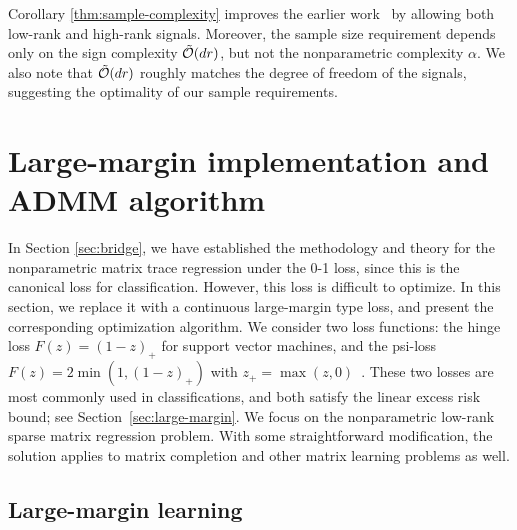 \documentclass[aos]{imsart}
\theoremstyle{definition}
\begin{document}
\noindent
Corollary \ref{thm:sample-complexity} improves the earlier work~\cite{yuan2016tensor, pmlr-v119-lee20i} by allowing both low-rank and high-rank signals. Moreover, the sample size requirement depends only on the sign complexity $\tilde {\mathcal{O}}(dr)$, but not the nonparametric complexity $\alpha$. We also note that $\tilde {\mathcal{O}}(dr)$ roughly matches the degree of freedom of the signals, suggesting the optimality of our sample requirements.





\section{Large-margin implementation and ADMM algorithm}
\label{sec:estimation}

In Section \ref{sec:bridge}, we have established the methodology and theory for the nonparametric matrix trace regression under the 0-1 loss, since this is the canonical loss for classification. However, this loss is difficult to optimize. In this section, we replace it with a continuous large-margin type loss, and present the corresponding optimization algorithm. We consider two loss functions: the hinge loss $F(z) = (1-z)_+$ for support vector machines, and the psi-loss $F(z)=2\min(1,(1-z)_+)$ with $z_{+}=\max(z,0)$~\cite{shen2003psi}. These two losses are most commonly used in classifications, and both satisfy the linear excess risk bound; see Section~\ref{sec:large-margin}. We focus on the nonparametric low-rank sparse matrix regression problem. With some straightforward modification, the solution applies to matrix completion and other matrix learning problems as well. 



\subsection{Large-margin learning} 
\end{document}

